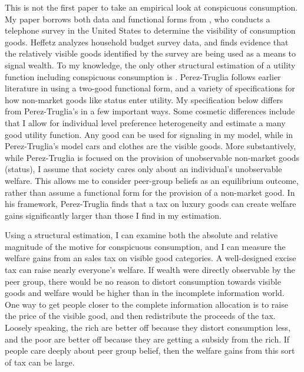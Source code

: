 This is not the first paper to take an empirical look at conspicuous consumption.\citep{Blochetal2004,Charlesetal2009,MoavNeeman2010,MoavNeeman2012}  My paper borrows both data and functional forms from \citet{Heffetz2011}, who conducts a telephone survey in the United States to determine the visibility of consumption goods.  Heffetz analyzes household budget survey data, and finds evidence that the relatively visible goods identified by the survey are being used as a means to signal wealth.  To my knowledge, the only other structural estimation of a utility function including conspicuous consumption is \citet{perez2013measuring}.  Perez-Truglia follows earlier literature in using a two-good functional form, and a variety of specifications for how non-market goods like status enter utility.  My specification below differs from Perez-Truglia's in a few important ways.  Some cosmetic differences include that I allow for individual level preference heterogeneity and estimate a many good utility function.  Any good can be used for signaling in my model, while in Perez-Truglia's model cars and clothes are the visible goods.  More substantively, while Perez-Truglia is focused on the provision of unobservable non-market goods (status), I assume that society cares only about an individual's unobservable welfare.  This allows me to consider peer-group beliefs as an equilibrium outcome, rather than assume a functional form for the provision of a non-market good.  In his framework, Perez-Truglia finds that a tax on luxury goods can create welfare gains significantly larger than those I find in my estimation.

Using a structural estimation, I can examine both the absolute and relative magnitude of the motive for conspicuous consumption, and I can measure the welfare gains from an sales tax on visible good categories.  A well-designed excise tax can raise nearly everyone's welfare.  If wealth were directly observable by the peer group, there would be no reason to distort consumption towards visible goods and welfare would be higher than in the incomplete information world.  One way to get people closer to the complete information allocation is to raise the price of the visible good, and then redistribute the proceeds of the tax.  Loosely speaking, the rich are better off because they distort consumption less, and the poor are better off because they are getting a subsidy from the rich.  If people care deeply about peer group belief, then the welfare gains from this sort of tax can be large.\footnotemark{} 

